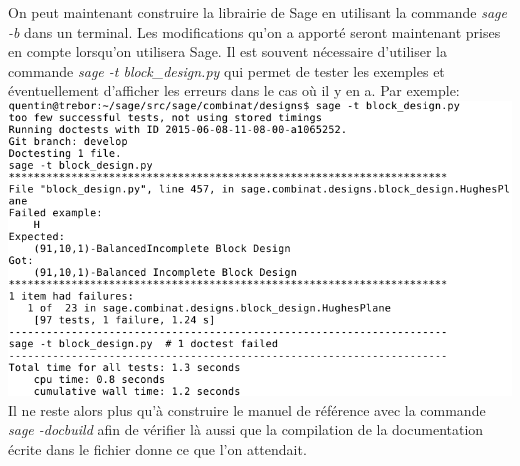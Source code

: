 \documentclass[a4paper]{article}
\begin{document}
\newpage
On peut maintenant construire la librairie de Sage en utilisant la commande \textit{sage -b} dans un terminal. Les modifications qu'on a apporté seront maintenant prises en compte lorsqu'on utilisera Sage. Il est souvent nécessaire d'utiliser la commande \textit{sage -t block\_design.py} qui permet de tester les exemples et éventuellement d'afficher les erreurs dans le cas où il y en a. Par exemple:\vspace{1\baselineskip}\\
\includegraphics[scale=0.6]{hugheserror.png}\vspace{1\baselineskip}\\
Il ne reste alors plus qu'à construire le manuel de référence avec la commande \textit{sage -docbuild} afin de vérifier là aussi que la compilation de la documentation écrite dans le fichier donne ce que l'on attendait.



\newpage
\end{document}
